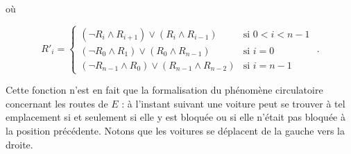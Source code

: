 o\`u

\[R'_{i}=\begin{cases}(\neg R_{i}\wedge R_{i+1})\vee(R_{i}\wedge R_{i-1}) &\text{si }0<i<n-1\\ (\neg R_{0}\wedge R_{1})\vee(R_{0}\wedge R_{n-1}) &\text{si }i=0\\ (\neg R_{n-1}\wedge R_{0})\vee(R_{n-1}\wedge R_{n-2}) &\text{si }i=n-1\end{cases}\text{ .}\]

Cette fonction n'est en fait que la formalisation du ph\'enom\`ene circulatoire concernant les routes de $E$ : \`a l'instant suivant une voiture peut se trouver \`a tel emplacement si et seulement si elle y est bloqu\'ee ou si elle n'\'etait pas bloqu\'ee \`a la position pr\'ec\'edente. Notons que les voitures se d\'eplacent de la gauche vers la droite.
\par